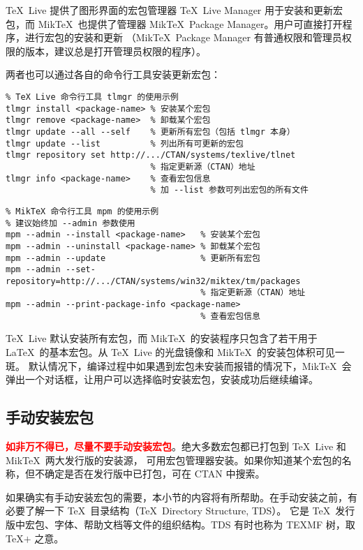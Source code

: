 \TeX\ Live 提供了图形界面的宏包管理器 \TeX\ Live Manager 用于安装和更新宏包，而 Mik\-\TeX\ 也提供了管理器
Mik\-\TeX\ Package Manager。用户可直接打开程序，进行宏包的安装和更新
（Mik\TeX\ Package Manager 有普通权限和管理员权限的版本，建议总是打开管理员权限的程序）。

两者也可以通过各自的命令行工具安装更新宏包：
\begin{verbatim}
% TeX Live 命令行工具 tlmgr 的使用示例
tlmgr install <package-name> % 安装某个宏包
tlmgr remove <package-name>  % 卸载某个宏包
tlmgr update --all --self    % 更新所有宏包（包括 tlmgr 本身）
tlmgr update --list          % 列出所有可更新的宏包
tlmgr repository set http://.../CTAN/systems/texlive/tlnet
                             % 指定更新源（CTAN）地址
tlmgr info <package-name>    % 查看宏包信息
                             % 加 --list 参数可列出宏包的所有文件
\end{verbatim}

\begin{verbatim}
% MikTeX 命令行工具 mpm 的使用示例
% 建议始终加 --admin 参数使用
mpm --admin --install <package-name>   % 安装某个宏包
mpm --admin --uninstall <package-name> % 卸载某个宏包
mpm --admin --update                   % 更新所有宏包
mpm --admin --set-repository=http://.../CTAN/systems/win32/miktex/tm/packages
                                       % 指定更新源（CTAN）地址
mpm --admin --print-package-info <package-name>
                                       % 查看宏包信息
\end{verbatim}

\TeX\ Live 默认安装所有宏包，而 Mik\TeX\ 的安装程序只包含了若干用于 \LaTeX\ 的基本宏包。从 \TeX\ Live 的光盘镜像和 Mik\-\TeX\ 的安装包体积可见一斑。
默认情况下，编译过程中如果遇到宏包未安装而报错的情况下，Mik\TeX\ 会弹出一个对话框，让用户可以选择临时安装宏包，安装成功后继续编译。

\subsection{手动安装宏包}\label{subsec:pkg-manual-install}

\textbf{\textcolor{red}{如非万不得已，尽量不要手动安装宏包}}。绝大多数宏包都已打包到 \TeX\ Live 和 Mik\TeX\ 两大发行版的安装源，
可用宏包管理器安装。如果你知道某个宏包的名称，但不确定是否在发行版中已打包，可在 CTAN 中搜索。

如果确实有手动安装宏包的需要，本小节的内容将有所帮助。在手动安装之前，有必要了解一下 \TeX\ 目录结构（\TeX\ Directory Structure, TDS）。
它是 \TeX\ 发行版中宏包、字体、帮助文档等文件的组织结构。TDS 有时也称为 TEXMF 树，取 \TeX$+$ 之意。

